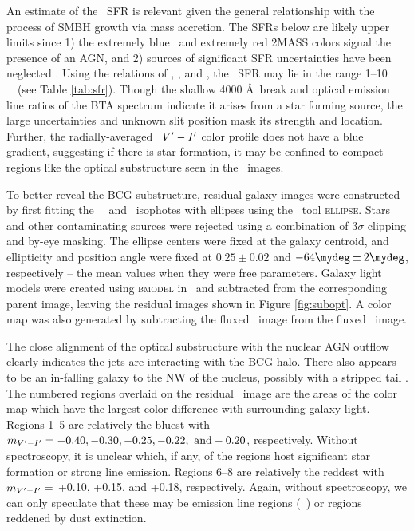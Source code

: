 \documentclass{emulateapj}
\begin{document}
An estimate of the \rbs\ SFR is relevant given the general
relationship with the process of SMBH growth via mass accretion. The
SFRs below are likely upper limits since 1) the extremely blue
\galex\ and extremely red 2MASS colors signal the presence of an AGN,
and 2) sources of significant SFR uncertainties have been neglected
\citep[\eg][]{1992ApJ...388..310K, 2004AJ....127.2002K, hicksuv,
  2010MNRAS.tmp..626G}. Using the relations of \citet{kennicutt2},
\citet{2006ApJ...642..775M}, and \citet{salim2007}, the \rbs\ SFR may
lie in the range 1--10 ~\msolpy\ (see Table \ref{tab:sfr}). Though the
shallow 4000 \AA\ break and optical emission line ratios of the BTA
spectrum indicate it arises from a star forming source, the large
uncertainties and unknown slit position mask its strength and
location. Further, the radially-averaged \hst\ $V^{\prime}-I^{\prime}$ color
profile does not have a blue gradient, suggesting if there is star
formation, it may be confined to compact regions like the optical
substructure seen in the \hst\ images.

To better reveal the BCG substructure, residual galaxy images were
constructed by first fitting the \hst\ \myv\ and \myi\ isophotes with
ellipses using the \iraf\ tool {\textsc{ellipse}}. Stars and other
contaminating sources were rejected using a combination of $3\sigma$
clipping and by-eye masking. The ellipse centers were fixed at the
galaxy centroid, and ellipticity and position angle were fixed at
$0.25 \pm 0.02$ and $-64\mydeg \pm 2\mydeg$, respectively -- the mean
values when they were free parameters. Galaxy light models were
created using {\textsc{bmodel}} in \iraf\ and subtracted from the
corresponding parent image, leaving the residual images shown in
Figure \ref{fig:subopt}. A color map was also generated by subtracting
the fluxed \myi\ image from the fluxed \myv\ image.

The close alignment of the optical substructure with the nuclear AGN
outflow clearly indicates the jets are interacting with the BCG
halo. There also appears to be an in-falling galaxy to the NW of the
nucleus, possibly with a stripped tail
\citep[\eg][]{2007ApJ...671..190S}. The numbered regions overlaid on
the residual \myv\ image are the areas of the color map which have the
largest color difference with surrounding galaxy light. Regions 1--5
are relatively the bluest with $m_{V^{\prime}-I^{\prime}} = -0.40, -0.30, -0.25,
-0.22, ~\rm{and} -0.20$, respectively. Without spectroscopy, it is
unclear which, if any, of the regions host significant star formation
or strong line emission. Regions 6--8 are relatively the reddest with
$m_{V^{\prime}-I^{\prime}} =$ +0.10, +0.15, and +0.18, respectively. Again,
without spectroscopy, we can only speculate that these may be emission
line regions (\eg\ \halpha) or regions reddened by dust extinction.
\end{document}

